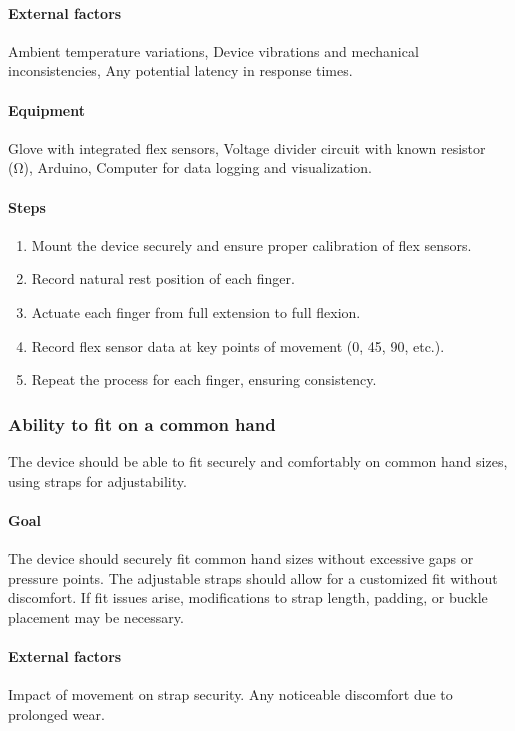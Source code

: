 \documentclass{article}
\begin{document}
\paragraph{External factors} Ambient temperature variations, Device vibrations and mechanical inconsistencies, Any potential latency in response times.

\paragraph{Equipment} Glove with integrated flex sensors, Voltage divider circuit with known resistor (\si{\ohm}), Arduino, Computer for data logging and visualization.

\paragraph{Steps}
\begin{enumerate}
    \item Mount the device securely and ensure proper calibration of flex sensors.
    \item Record natural rest position of each finger.
    \item Actuate each finger from full extension to full flexion.
    \item Record flex sensor data at key points of movement (0, 45, 90, etc.).
    \item Repeat the process for each finger, ensuring consistency.
\end{enumerate}

\subsubsection{Ability to fit on a common hand}
The device should be able to fit securely and comfortably on common hand sizes, using straps for adjustability.

\paragraph{Goal} The device should securely fit common hand sizes without excessive gaps or pressure points. The adjustable straps should allow for a customized fit without discomfort. If fit issues arise, modifications to strap length, padding, or buckle placement may be necessary.

\paragraph{External factors} Impact of movement on strap security. Any noticeable discomfort due to prolonged wear.
\end{document}

